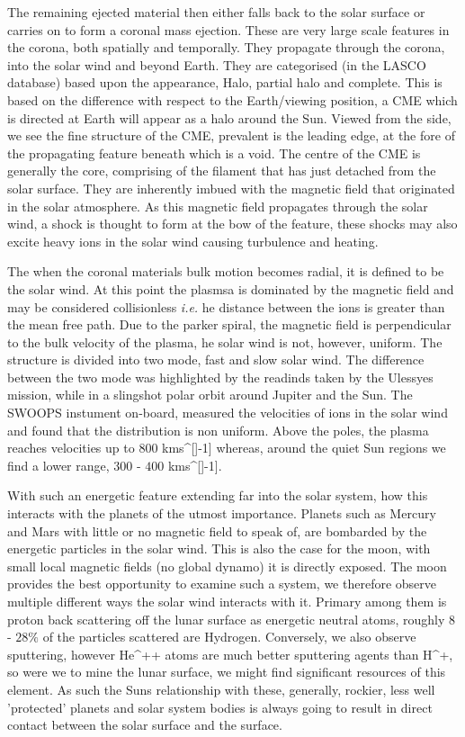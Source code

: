 The remaining ejected material then either falls back to the solar surface or carries on to form a coronal mass ejection.
These are very large scale features in the corona, both spatially and temporally.
They propagate through the corona, into the solar wind and beyond Earth.
They are categorised (in the LASCO database) based upon the appearance, Halo, partial halo and complete.
This is based on the difference with respect to the Earth/viewing position, a CME which is directed at Earth will appear as a halo around the Sun.
Viewed from the side, we see the fine structure of the CME, prevalent is the leading edge, at the fore of the propagating feature beneath which is a void.
The centre of the CME is generally the core, comprising of the filament that has just detached from the solar surface.
They are inherently imbued with the magnetic field that originated in the solar atmosphere.
As this magnetic field propagates through the solar wind, a shock is thought to form at the bow of the feature, these shocks may also excite heavy ions in the solar wind causing turbulence and heating.

The when the coronal materials bulk motion becomes radial, it is defined to be the solar wind.
At this point the plasmsa is dominated by the magnetic field and may be considered collisionless \emph{i.e.} he distance between the ions is greater than the mean free path.
Due to the parker spiral, the magnetic field is perpendicular to the bulk velocity of the plasma, he solar wind is not, however, uniform.
The structure is divided into two mode, fast and slow solar wind. 
The difference between the two mode was highlighted by the readinds taken by the Ulessyes mission, while in a slingshot polar orbit around Jupiter and the Sun.
The SWOOPS instument on-board, measured the velocities of ions in the solar wind and found that the distribution is non uniform.
Above the poles, the plasma reaches velocities up to $800$ kms{^[]-1]} whereas, around the quiet Sun regions we find a lower range, $300$ - $400$ kms{^[]-1]}.

With such an energetic feature extending far into the solar system, how this interacts with the planets of the utmost importance.
Planets such as Mercury and Mars with little or no magnetic field to speak of, are bombarded by the energetic particles in the solar wind.
This is also the case for the moon, with small local magnetic fields (no global dynamo) it is directly exposed.
The moon provides the best opportunity to examine such a system, we therefore observe multiple different ways the solar wind interacts with it.
Primary among them is proton back scattering off the lunar surface as energetic neutral atoms, roughly $8$ - $28\%$ of the particles scattered are Hydrogen.
Conversely, we also observe sputtering, however He{^++} atoms are much better sputtering agents than H{^+}, so were we to mine the lunar surface, we might find significant resources of this element. 
As such the Suns relationship with these, generally, rockier, less well 'protected' planets and solar system bodies is always going to result in direct contact between the solar surface and the surface.

